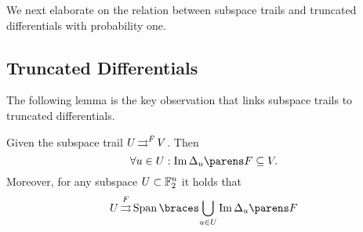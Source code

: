 We next elaborate on the relation between subspace trails and truncated differentials with probability one.

\subsection{Truncated Differentials}

The following lemma is the key observation that links subspace trails to truncated differentials.
 \begin{lemma}\label{st:lem:st_trunc_diff}
    Given the subspace trail $U \operatorname*{\rightrightarrows}^{F}_{} V$.
    Then
    \begin{equation*}
        \forall u \in U: \Im{\derive{u}{F}} \subseteq V.
    \end{equation*}
    Moreover, for any subspace $U \subset \mathbb{F}_2^n$ it holds that
    \begin{equation*}
        \propDiff{U}{F}{}{\Span{\bigcup_{u \in U} \Im{\derive{u}{F}}}}
    \end{equation*}
\end{lemma}


